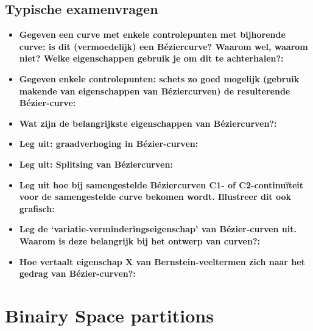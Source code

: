 \documentclass[12pt,a4paper]{article}
\begin{document}
	\subsection{Typische examenvragen}
	\begin{itemize}
		\item \textbf{Gegeven een curve met enkele controlepunten met bijhorende curve: is dit (vermoedelijk) een Béziercurve? Waarom wel, waarom niet? Welke eigenschappen gebruik je om dit te achterhalen?:}\\
		\item \textbf{Gegeven enkele controlepunten: schets zo goed mogelijk (gebruik makende van eigenschappen van Béziercurven) de resulterende Bézier-curve:}\\
		\item \textbf{Wat zijn de belangrijkste eigenschappen van Béziercurven?:}\\
		\item \textbf{Leg uit: graadverhoging in Bézier-curven:}\\
		\item \textbf{Leg uit: Splitsing van Béziercurven:}\\
		\item \textbf{Leg uit hoe bij samengestelde Béziercurven C1- of C2-continuïteit voor de samengestelde curve bekomen wordt. Illustreer dit ook grafisch:}\\
		\item \textbf{Leg de ‘variatie-verminderingseigenschap’ van Bézier-curven uit. Waarom is deze belangrijk bij het ontwerp van curven?:}\\
		\item \textbf{Hoe vertaalt eigenschap X van Bernstein-veeltermen zich naar het gedrag van Bézier-curven?:}\\
	\end{itemize}
	
	
	\section{Binairy Space partitions}
\end{document}
